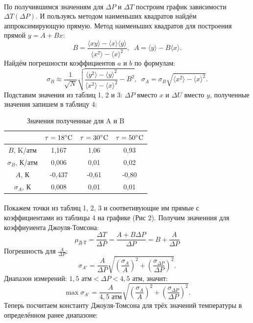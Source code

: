 \documentclass[a4paper,12pt]{article} %
\begin{document}
\paragraph{}
По получившимся значениям для $\Delta P$ и $\Delta T$ построим график зависимости $\Delta T \left( \Delta P \right)$. И пользуясь методом наименьших квадратов найдём аппроксимирующую прямую. Метод наименьших квадратов для построения прямой $ y = A + B x $:
\[
B = \frac{\langle xy \rangle - \langle x \rangle \langle y \rangle}{\langle x^2 \rangle - \langle x \rangle ^ 2}, \;\;
A = \langle y \rangle - B \langle x \rangle .
\]
Найдём погрешности коэффициентов $a$ и $b$ по формулам:
\[
\sigma_B \approx \frac{1}{\sqrt{N}}\sqrt{\frac{\langle y^2 \rangle - \langle y \rangle ^ 2}{\langle x^2 \rangle - \langle x \rangle ^ 2} - B^2}, \;\;
\sigma_A = \sigma_B \sqrt{\langle x^2 \rangle - \langle x \rangle ^ 2}.
\]
Подставим значения из таблиц 1, 2 и 3: $\Delta P$ вместо $x$ и $\Delta U$ вместо $y$, полученные значения запишем в таблицу 4:

\begin{table}[h]
\begin{center}
\begin{tabular}{|c||c|c|c|}
\hline 
 & $\tau = 18\text{\degree C}$ & $\tau = 30\text{\degree C}$ & $\tau = 50\text{\degree C}$ \\ 
\hline 
$B$, K/атм & 1,167 & 1,06 & 0,93 \\ 
\hline 
$\sigma_B$, К/атм & 0,006 & 0,01 & 0,02 \\ 
\hline 
$A$, К & -0,437 & -0,61 & -0,80 \\ 
\hline 
$\sigma_A$, К & 0,008 & 0,01 & 0,01 \\ 
\hline 
\end{tabular} 
\end{center}
\caption{Значения полученные для A и B}
\end{table}

\paragraph{}
Покажем точки из таблиц 1, 2, 3 и соответивующие им прямые с коэффициентами из таблицы 4 на графике (Рис 2).	Получим значенния для коэффиуиента Джоуля-Томсона:
\[
\mu_\text{Д-Т} = \frac{\Delta T}{\Delta P} = \frac{A + B \Delta P}{\Delta P} = B + \frac{A}{\Delta P}
\]
Погрешность для $\frac{A}{\Delta P}$: 
\[
\sigma_{A'} = \frac{A}{\Delta P} \sqrt{\left(\frac{\sigma_A}{A}\right)^2 + \left(\frac{\sigma_{\Delta P}}{\Delta P}\right)^2}. 
\]
Диапазон измерений: $ 1,5\text{ атм} < \Delta P < 4,5 \text{ атм} $, значит:
\[
\max{\sigma_{A'}} = \frac{A}{4,5 \text{ атм}} \sqrt{\left(\frac{\sigma_A}{A}\right)^2 + \left(\frac{\sigma_{\Delta P}}{\Delta P}\right)^2}. 
\]
Теперь посчитаем константу Джоуля-Томсона для трёх значений температуры в определённом ранее диапазоне:
\end{document}
